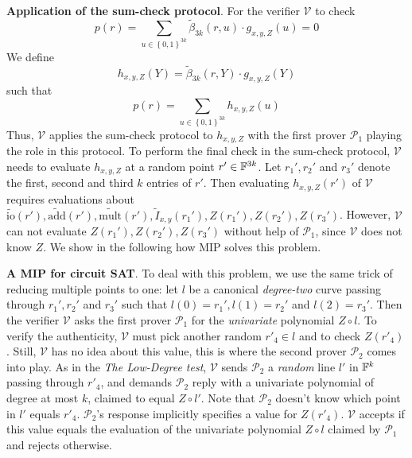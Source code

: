\documentclass{article}
\begin{document}
\textbf{Application of the sum-check protocol}. For the verifier $\mathcal{V}$ to check 
\begin{equation} \label{eq:identifier-sum-check}
p(r) = \sum_{u \in \left\{ 0, 1 \right\}^{3k}} \widetilde{\beta}_{3k}(r, u) \cdot g_{x, y, Z}(u) = 0
\end{equation}
We define
\begin{equation*}
h_{x, y, Z}(Y) = \widetilde{\beta}_{3k}(r, Y) \cdot g_{x, y, Z}(Y)
\end{equation*}
such that 
\begin{equation*}
p(r) = \sum_{u \in \left\{ 0, 1 \right\}^{3k}} h_{x, y, Z}(u)
\end{equation*}
Thus, $\mathcal{V}$ applies the sum-check protocol to $h_{x, y, Z}$ with the first prover $\mathcal{P}_1$ playing the role in this protocol. To perform the final check in the sum-check protocol, $\mathcal{V}$ needs to evaluate $h_{x, y, Z}$ at a random point $r' \in \mathbb{F}^{3k}$. Let $r_1', r_2'$ and $r_3'$ denote the first, second and third $k$ entries of $r'$. Then evaluating $h_{x, y, Z}(r')$ of $\mathcal{V}$ requires evaluations about $\widetilde{\text{io}}(r'), \widetilde{\text{add}}(r'), \widetilde{\text{mult}}(r'), \widetilde{I}_{x, y}(r_1'), Z(r_1'), Z(r_2'), Z(r_3')$. However, $\mathcal{V}$ can not evaluate $Z(r_1'), Z(r_2'), Z(r_3')$ without help of $\mathcal{P}_1$, since $\mathcal{V}$ does not know $Z$. We show in the following how MIP solves this problem.

\textbf{A MIP for circuit SAT}. To deal with this problem, we use the same trick of reducing multiple points to one: let $l$ be a canonical \textit{degree-two} curve passing through $r_1', r_2'$ and $r_3'$ such that $l(0) = r_1', l(1) = r_2'$ and $l(2) = r_3'$. Then the verifier $\mathcal{V}$ asks the first prover $\mathcal{P}_1$ for the \textit{univariate} polynomial $Z \circ l$. To verify the authenticity, $\mathcal{V}$ must pick another random $r'_4 \in l$ and to check $Z(r'_4)$. Still, $\mathcal{V}$ has no idea about this value, this is where the second prover $\mathcal{P}_2$ comes into play. As in the \textit{The Low-Degree test}, $\mathcal{V}$ sends $\mathcal{P}_2$ a \textit{random} line $l'$ in $\mathbb{F}^k$ passing through $r'_{4}$, and demands $\mathcal{P}_2$ reply with a univariate polynomial of degree at most $k$, claimed to equal $Z \circ l'$. Note that $\mathcal{P}_2$ doesn't know which point in $l'$ equals $r'_4$. $\mathcal{P}_2$'s response implicitly specifies a value for $Z(r'_{4})$. $\mathcal{V}$ accepts if this value equals the evaluation of the univariate polynomial $Z \circ l$ claimed by $\mathcal{P}_1$ and rejects otherwise.  
\end{document}
